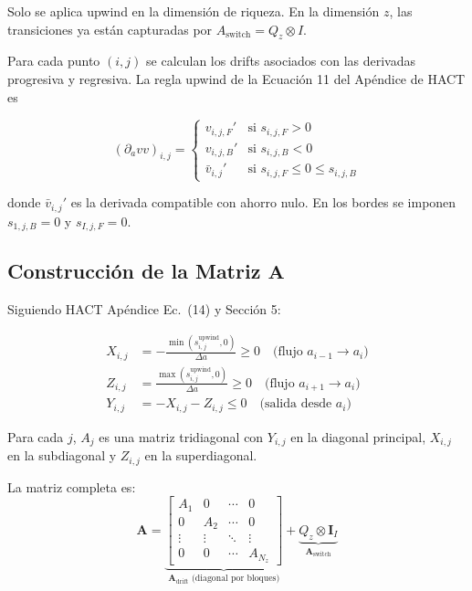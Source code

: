 \documentclass[12pt]{article}
\newcommand{\dVa}{\partial_a v}
\begin{document}
Solo se aplica upwind en la dimensión de riqueza. En la dimensión $z$, las transiciones ya están capturadas por $A_{\text{switch}} = Q_z \otimes I$.

Para cada punto $(i,j)$ se calculan los drifts asociados con las derivadas progresiva y regresiva. La regla upwind de la Ecuación 11 del Apéndice de HACT es

\begin{equation}\label{eq:upwind}
(\dVa v)_{i,j} =
\begin{cases}
v_{i,j,F}' & \text{si } s_{i,j,F} > 0 \\
v_{i,j,B}' & \text{si } s_{i,j,B} < 0 \\
\bar{v}_{i,j}' & \text{si } s_{i,j,F} \le 0 \le s_{i,j,B}
\end{cases}
\end{equation}

donde $\bar{v}_{i,j}'$ es la derivada compatible con ahorro nulo. En los bordes se imponen $s_{1,j,B}=0$ y $s_{I,j,F}=0$.

\subsection{Construcción de la Matriz $\mathbf{A}$}

Siguiendo HACT Apéndice Ec.~(14) y Sección 5:

\begin{equation}\label{eq:A_construction}
\begin{aligned}
X_{i,j} &= -\frac{\min(s_{i,j}^{\text{upwind}}, 0)}{\Delta a} \ge 0 \quad \text{(flujo } a_{i-1} \to a_i) \\
Z_{i,j} &= \frac{\max(s_{i,j}^{\text{upwind}}, 0)}{\Delta a} \ge 0 \quad \text{(flujo } a_{i+1} \to a_i) \\
Y_{i,j} &= -X_{i,j} - Z_{i,j} \le 0 \quad \text{(salida desde } a_i)
\end{aligned}
\end{equation}

Para cada $j$, $A_j$ es una matriz tridiagonal con $Y_{i,j}$ en la diagonal principal, $X_{i,j}$ en la subdiagonal y $Z_{i,j}$ en la superdiagonal.

La matriz completa es:
\begin{equation}\label{eq:A_full}
\mathbf{A} = \underbrace{\begin{bmatrix} A_1 & 0 & \cdots & 0 \\ 0 & A_2 & \cdots & 0 \\ \vdots & \vdots & \ddots & \vdots \\ 0 & 0 & \cdots & A_{N_z} \end{bmatrix}}_{\mathbf{A}_{\text{drift}} \text{ (diagonal por bloques)}} + \underbrace{Q_z \otimes \mathbf{I}_I}_{\mathbf{A}_{\text{switch}}}
\end{equation}
\end{document}
